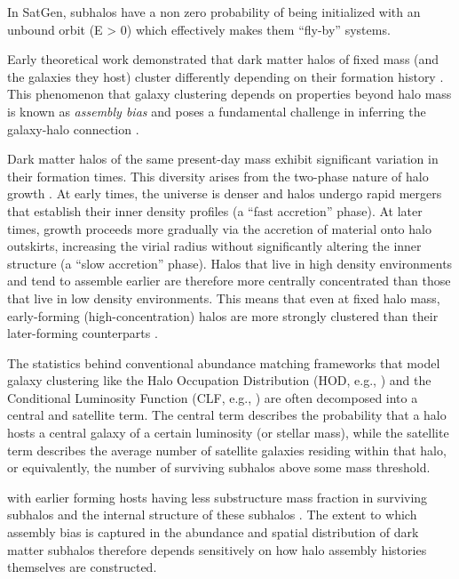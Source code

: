 In SatGen, subhalos have a non zero probability of being initialized with an unbound orbit (E > 0) which effectively makes them ``fly-by'' systems.


Early theoretical work demonstrated that dark matter halos of fixed mass (and the galaxies they host) cluster differently depending on their formation history \citep{Zheng.etal.05, Zentner.etal.05, Wechsler.etal.06, Dalal.etal.08, Giocoli.etal.10}. This phenomenon that galaxy clustering depends on properties beyond halo mass is known as \textit{assembly bias} and poses a fundamental challenge in inferring the galaxy-halo connection \citep{Zentner.etal.14}.

Dark matter halos of the same present-day mass exhibit significant variation in their formation times. This diversity arises from the two-phase nature of halo growth \citep{ Zhao.etal.09, Hoffman.etal.07}. At early times, the universe is denser and halos undergo rapid mergers that establish their inner density profiles (a “fast accretion” phase). At later times, growth proceeds more gradually via the accretion of material onto halo outskirts, increasing the virial radius without significantly altering the inner structure (a “slow accretion” phase). Halos that live in high density environments and tend to assemble earlier are therefore more centrally concentrated than those that live in low density environments. This means that even at fixed halo mass, early-forming (high-concentration) halos are more strongly clustered than their later-forming counterparts \citep{Gao.etal.05, Wechsler.etal.06}.

The statistics behind conventional abundance matching frameworks that model galaxy clustering like the Halo Occupation Distribution (HOD, e.g., \cite{Berlind.etal.03, Zheng.etal.05}) and the Conditional Luminosity Function (CLF, e.g., \cite{Yang.etal.03, vdBosch.etal.13}) are often decomposed into a central and satellite term. The central term describes the probability that a halo hosts a central galaxy of a certain luminosity (or stellar mass), while the satellite term describes the average number of satellite galaxies residing within that halo, or equivalently, the number of surviving subhalos above some mass threshold.

with earlier forming hosts having less substructure mass fraction in surviving subhalos and the internal structure of these subhalos \citep{vdBosch.etal.05a, Mao.etal.15, Jiang.vdBosch.17}. The extent to which assembly bias is captured in the abundance and spatial distribution of dark matter subhalos therefore depends sensitively on how halo assembly histories themselves are constructed.

